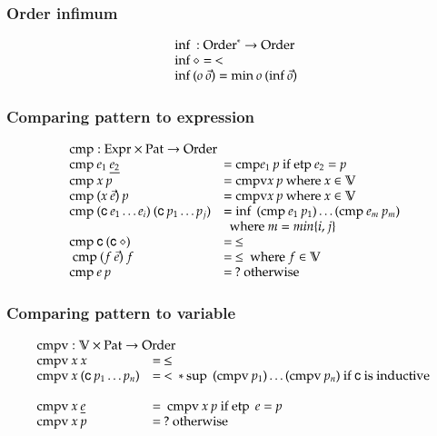 \subsubsection{Order infimum}
\[
\begin{array}[t]{ll}
\multicolumn{2}{l}{\info : \ves{\order} \ra \order}\\ 
\info \diamond = \: < \\
\info (o \: \vec{o} ) = \mino o \: (\info \vec{o}) \\
\end{array}
\]

\newcommand{\cmp}{\mathrm{cmp}}
\newcommand{\cmpv}{\mathrm{cmpv}}
\newcommand{\cmps}{\mathrm{cmps}}
\newcommand{\cmpsv}{\mathrm{cmpsv}}
\newcommand{\etp}{\mathrm{etp}\:}

\subsubsection{Comparing pattern to expression}
\[
\begin{array}[t]{ll}
\multicolumn{2}{l}{\cmp : \Expr \times \Pat \ra \order}\\ 
\cmp \: e_1 \: \inacc{e_2} & = \cmp e_1 \: p \mbox{ if } \etp e_2 = p \\
\cmp \: x \: p & = \cmpv x \:p  \mbox{ where } x \in \cV \\
\cmp \: (x \: \vec{e}) \: p & = \cmpv x \:p  \mbox{ where } x \in \cV \\
\cmp \: (\cc \: e_1 \ldots e_i) \: (\cc \: p_1 \ldots p_j) & = \info \: (\cmp \: e_1 \: p_1) \ldots (\cmp \: e_m \: p_m)\\
& \: \mbox { where } m = min\{i,j\}\\ 
\cmp \: \cc \: (\cc \: \diamond) & = \: \leq \\\
\cmp \: (f \: \vec{e}) \: f & = \: \leq \mbox{ where } f \in \cV \\
\cmp \: e \: p & = \: ? \mbox{ otherwise}
\end{array}
\]

\subsubsection{Comparing pattern to variable}
\[
\begin{array}[t]{ll}
\multicolumn{2}{l}{\cmpv : \cV \times \Pat \ra \order}\\ 
\cmpv \: x \: x & = \: \leq \\
\cmpv \: x \: (\cc \: p_1 \ldots p_n) & = \: < \: * \: \supo \: (\cmpv \: p_1) \ldots (\cmpv \: p_n) \mbox{ if } \cc \mbox{ is inductive }\\   \\
\cmpv \: x \: \inacc{e} & = \: \cmpv \: x \: p \mbox{ if } \etp \: e = p \\
\cmpv \: x \: p & = \: ? \mbox{ otherwise}
\end{array}
\]

